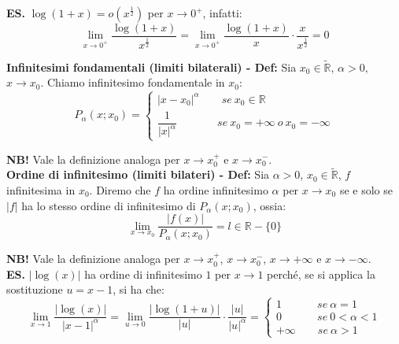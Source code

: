 \documentclass{article}
\begin{document}
\noindent\textbf{ES.} $\log(1 + x) = o(x^\frac{1}{2})$ per $x \to 0^+$, infatti:
\begin{equation*}
    \lim_{x \to 0^+} \frac{\log(1 + x)}{x^\frac{1}{2}} = \lim_{x \to 0^+} \frac{\log(1 + x)}{x} \cdot \frac{x}{x^\frac{1}{2}} = 0
\end{equation*}

\noindent\textbf{Infinitesimi fondamentali (limiti bilaterali) - Def:} Sia $x_0 \in \widetilde{\mathbb{R}}$, $\alpha > 0$, $x \to x_0$. Chiamo infinitesimo fondamentale in $x_0$:
\begin{equation*}
    P_\alpha(x; x_0) = \begin{cases}
        |x - x_0|^\alpha \qquad se \ x_0 \in \mathbb{R}\\
        \dfrac{1}{|x|^\alpha} \qquad \quad \ \ \ se \ x_0 = +\infty \ o \ x_0 = -\infty
    \end{cases}
\end{equation*}

\noindent\textbf{NB!} Vale la definizione analoga per $x \to x_0^+$ e $x \to x_0^-$.\\

\noindent\textbf{Ordine di infinitesimo (limiti bilateri) - Def:} Sia $\alpha > 0$, $x_0 \in \widetilde{\mathbb{R}}$, $f$ infinitesima in $x_0$. Diremo che $f$ ha ordine infinitesimo $\alpha$ per $x \to x_0$ se e solo se $|f|$ ha lo stesso ordine di infinitesimo di $P_\alpha(x; x_0)$, ossia:
\begin{equation*}
    \lim_{x \to x_0} \frac{|f(x)|}{P_\alpha(x; x_0)} = l \in \mathbb{R} - \{0\}
\end{equation*}

\noindent\textbf{NB!} Vale la definizione analoga per $x \to x_0^+$, $x \to x_0^-$, $x \to +\infty$ e $x \to -\infty$.\\

\noindent\textbf{ES.} $|\log(x)|$ ha ordine di infinitesimo $1$ per $x \to 1$ perché, se si applica la sostituzione $u = x - 1$, si ha che:
\begin{equation*}
    \lim_{x \to 1} \frac{|\log(x)|}{|x - 1|^\alpha} = \lim_{u \to 0} \frac{|\log(1 + u)|}{|u|} \cdot \frac{|u|}{|u|^\alpha} = \begin{cases}
        1 \qquad \quad \ se \ \alpha = 1\\
        0 \qquad \quad \ se \ 0 < \alpha < 1\\
        +\infty \qquad se \ \alpha > 1
    \end{cases}
\end{equation*}
\end{document}
